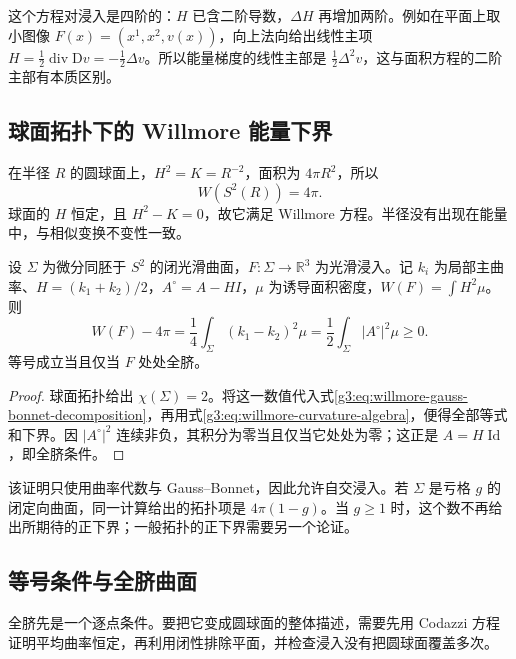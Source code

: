 这个方程对浸入是四阶的：\(H\) 已含二阶导数，\(\Delta H\) 再增加两阶。例如在平面上取小图像 \(F(x)=(x^1,x^2,v(x))\)，向上法向给出线性主项 \(H=\tfrac12\operatorname{div}\mathrm Dv=-\tfrac12\Delta v\)。所以能量梯度的线性主部是 \(\tfrac12\Delta^2v\)，这与面积方程的二阶主部有本质区别。

\subsection{球面拓扑下的 Willmore 能量下界}
\label{g3:subsec:1906:03}
在半径 \(R\) 的圆球面上，\(H^2=K=R^{-2}\)，面积为 \(4\pi R^2\)，所以
\[
	W(S^2(R))=4\pi.
\]
球面的 \(H\) 恒定，且 \(H^2-K=0\)，故它满足 Willmore 方程。半径没有出现在能量中，与相似变换不变性一致。

\begin{theorem}\label{g3:thm:willmore-sphere-bound}
	设 \(\Sigma\) 为微分同胚于 \(S^2\) 的闭光滑曲面，\(F:\Sigma\to\mathbb R^3\) 为光滑浸入。记 \(k_i\) 为局部主曲率、\(H=(k_1+k_2)/2\)，\(A^\circ=A-HI\)，\(\mu\) 为诱导面积密度，\(W(F)=\int H^2\mu\)。则
	\begin{equation}\label{g3:eq:willmore-sphere-defect}
		W(F)-4\pi
		=\frac14\int_\Sigma(k_1-k_2)^2\mu
		=\frac12\int_\Sigma|A^\circ|^2\mu\ge0.
	\end{equation}
	等号成立当且仅当 \(F\) 处处全脐。
\end{theorem}
\begin{proof}
	球面拓扑给出 \(\chi(\Sigma)=2\)。将这一数值代入式\eqref{g3:eq:willmore-gauss-bonnet-decomposition}，再用式\eqref{g3:eq:willmore-curvature-algebra}，便得全部等式和下界。因 \(|A^\circ|^2\) 连续非负，其积分为零当且仅当它处处为零；这正是 \(A=H\operatorname{Id}\)，即全脐条件。
\end{proof}

该证明只使用曲率代数与 Gauss--Bonnet，因此允许自交浸入。若 \(\Sigma\) 是亏格 \(g\) 的闭定向曲面，同一计算给出的拓扑项是 \(4\pi(1-g)\)。当 \(g\ge1\) 时，这个数不再给出所期待的正下界；一般拓扑的正下界需要另一个论证。

\subsection{等号条件与全脐曲面}
\label{g3:subsec:1906:04}
全脐先是一个逐点条件。要把它变成圆球面的整体描述，需要先用 Codazzi 方程证明平均曲率恒定，再利用闭性排除平面，并检查浸入没有把圆球面覆盖多次。

